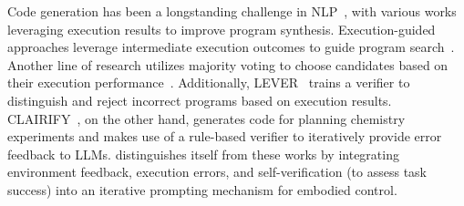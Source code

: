 Code generation has been a longstanding challenge in NLP~\cite{openai2021codex,nijkamp2022conversational,le2022coderl,chowdhery2022palm,brown2020gpt3}, with various works leveraging execution results to improve program synthesis. Execution-guided approaches leverage intermediate execution outcomes to guide program search~\cite{chen2019execution,chen2021latent,ellis2019write}. Another line of research utilizes majority voting to choose candidates based on their execution performance~\cite{li2022competitionlevel,cobbe2021training}. Additionally, LEVER~\cite{ni2023lever} trains a verifier to distinguish and reject incorrect programs based on execution results. CLAIRIFY~\cite{skreta2023errors}, on the other hand, generates code for planning chemistry experiments and makes use of a rule-based verifier to iteratively provide error feedback to LLMs. \voyager distinguishes itself from these works by integrating environment feedback, execution errors, and self-verification (to assess task success) into an iterative prompting mechanism for embodied control.
